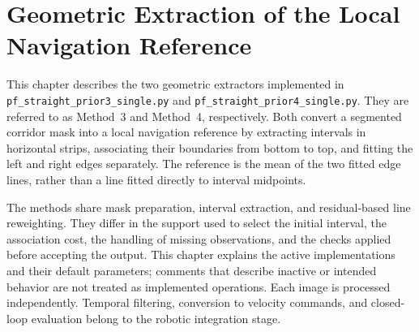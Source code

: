 \chapter{Geometric Extraction of the Local Navigation Reference}
\label{cap:geometric_reference}

This chapter describes the two geometric extractors implemented in
\texttt{pf\_\allowbreak straight\_\allowbreak prior3\_\allowbreak single.py}
and
\texttt{pf\_\allowbreak straight\_\allowbreak prior4\_\allowbreak single.py}.
They are referred to as Method~3 and Method~4, respectively. Both convert
a segmented corridor mask into a local navigation reference by extracting
intervals in horizontal strips, associating their boundaries from bottom
to top, and fitting the left and right edges separately. The reference
is the mean of the two fitted edge lines, rather than a line fitted
directly to interval midpoints.

The methods share mask preparation, interval extraction, and residual-based
line reweighting. They differ in the support used to select the initial
interval, the association cost, the handling of missing observations,
and the checks applied before accepting the output. This chapter explains
the active implementations and their default parameters; comments that
describe inactive or intended behavior are not treated as implemented
operations. Each image is processed independently. Temporal filtering,
conversion to velocity commands, and closed-loop evaluation belong to
the robotic integration stage.


